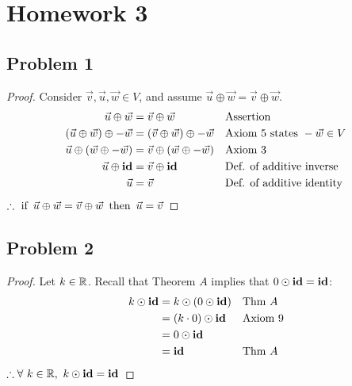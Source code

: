 \documentclass{article}
\begin{document}
\section*{Homework 3}

\subsection*{Problem 1}
\begin{proof}
    Consider $\vec{v}, \vec{u}, \vec{w} \in V$, and assume $\vec{u} \oplus \vec{w} = \vec{v} \oplus \vec{w}$.
    \begin{align*}
        \vec{u} \oplus \vec{w}                   & = \vec{v} \oplus \vec{w}                   &  & \text{Assertion}                     \\
        (\vec{u} \oplus \vec{w}) \oplus -\vec{w} & = (\vec{v} \oplus \vec{w}) \oplus -\vec{w} &  & \text{Axiom 5 states}~-\vec{w} \in V \\
        \vec{u} \oplus (\vec{w} \oplus -\vec{w}) & = \vec{v} \oplus (\vec{w} \oplus -\vec{w}) &  & \text{Axiom 3}                       \\
        \vec{u} \oplus \operatorname{\textbf{id}}                       & = \vec{v} \oplus \operatorname{\textbf{id}}                       &  & \text{Def. of additive inverse}      \\
        \vec{u}                                  & = \vec{v}                                  &  & \text{Def. of additive identity}
    \end{align*}
    $\therefore \operatorname{~\text{if}~} \vec{u} \oplus \vec{w} = \vec{v} \oplus \vec{w} \operatorname{~\text{then}~} \vec{u} = \vec{v}$
\end{proof}

\subsection*{Problem 2}
\begin{proof}
    Let $k \in \mathbb{R}$. Recall that Theorem $A$ implies that $0 \odot \operatorname{\textbf{id}} = \operatorname{\textbf{id}}$:
    \begin{align*}
        k \odot \operatorname{\textbf{id}} & = k \odot (0 \odot \operatorname{\textbf{id}}) &  & \text{Thm $A$} \\
                    & = (k \cdot 0) \odot \operatorname{\textbf{id}} &  & \text{Axiom 9} \\
                    & = 0 \odot \operatorname{\textbf{id}}                               \\
                    & = \operatorname{\textbf{id}}                   &  & \text{Thm $A$}
    \end{align*}
    $\therefore \forall~k \in \mathbb{R},~k \odot \operatorname{\textbf{id}} = \operatorname{\textbf{id}}$
\end{proof}
\end{document}
